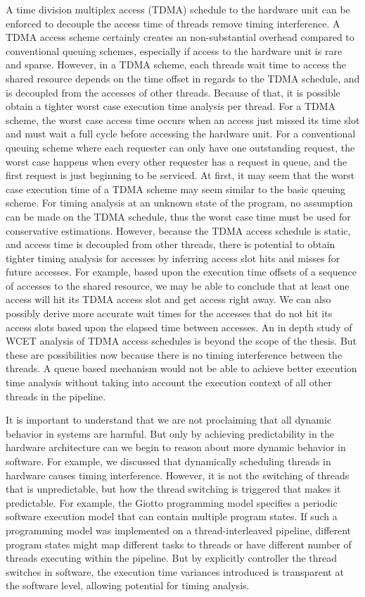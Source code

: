 A time division multiplex access (TDMA) schedule to the hardware unit can be enforced to decouple the access time of threads remove timing interference.
A TDMA access scheme certainly creates an non-substantial overhead compared to conventional queuing schemes, especially if access to the hardware unit is rare and sparse.
However, in a TDMA scheme, each threads wait time to access the shared resource depends on the time offset in regards to the TDMA schedule, and is decoupled from the accesses of other threads.
Because of that, it is possible obtain a tighter worst case execution time analysis per thread.
For a TDMA scheme, the worst case access time occurs when an access just missed its time slot and must wait a full cycle before accessing the hardware unit.
For a conventional queuing scheme where each requester can only have one outstanding request, the worst case happens when every other requester has a request in queue, and the first request is just beginning to be serviced.   
At first, it may seem that the worst case execution time of a TDMA scheme may seem similar to the basic queuing scheme.
For timing analysis at an unknown state of the program, no assumption can be made on the TDMA schedule, thus the worst case time must be used for conservative estimations. 
However, because the TDMA access schedule is static, and access time is decoupled from other threads, there is potential to obtain tighter timing analysis for accesses by inferring access slot hits and misses for future accesses. 
For example, based upon the execution time offsets of a sequence of accesses to the shared resource, we may be able to conclude that at least one access will hit its TDMA access slot and get access right away.
We can also possibly derive more accurate wait times for the accesses that do not hit its access slots based upon the elapsed time between accesses.
An in depth study of WCET analysis of TDMA access schedules is beyond the scope of the thesis.
But these are possibilities now because there is no timing interference between the threads. 
A queue based mechanism would not be able to achieve better execution time analysis without taking into account the execution context of all other threads in the pipeline.

It is important to understand that we are not proclaiming that all dynamic behavior in systems are harmful. 
But only by achieving predictability in the hardware architecture can we begin to reason about more dynamic behavior in software.
For example, we discussed that dynamically scheduling threads in hardware causes timing interference. 
However, it is not the switching of threads that is unpredictable, but how the thread switching is triggered that makes it predictable.   
For example, the Giotto programming model specifies a periodic software execution model that can contain multiple program states. 
If such a programming model was implemented on a thread-interleaved pipeline, different program states might map different tasks to threads or have different number of threads executing within the pipeline.
But by explicitly controller the thread switches in software, the execution time variances introduced is transparent at the software level, allowing potential for timing analysis.

